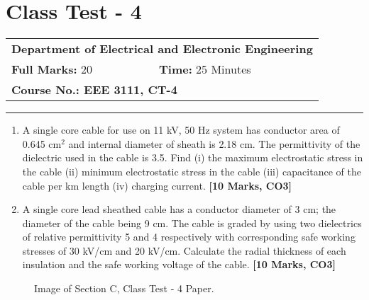 \documentclass[12pt, a4paper]{article}
\begin{document}
	\section{Class Test - 4}
	\begin{tabular}{ll}
		\multicolumn{2}{l}{\textbf{Department of Electrical and Electronic Engineering}} \\
		\textbf{Full Marks:} 20 & \textbf{Time:} 25 Minutes \\
		\multicolumn{2}{l}{\textbf{Course No.: EEE 3111, CT-4}} \\
	\end{tabular}
	\hrule
	\vspace{0.5cm}
	\begin{enumerate}[label=\textbf{Q.\arabic*}]
		\item A single core cable for use on 11 kV, 50 Hz system has conductor area of 0.645 cm$^2$ and internal diameter of sheath is 2.18 cm. The permittivity of the dielectric used in the cable is 3.5. Find (i) the maximum electrostatic stress in the cable (ii) minimum electrostatic stress in the cable (iii) capacitance of the cable per km length (iv) charging current. \hfill \textbf{[10 Marks, CO3]}
		
		\item A single core lead sheathed cable has a conductor diameter of 3 cm; the diameter of the cable being 9 cm. The cable is graded by using two dielectrics of relative permittivity 5 and 4 respectively with corresponding safe working stresses of 30 kV/cm and 20 kV/cm. Calculate the radial thickness of each insulation and the safe working voltage of the cable. \hfill \textbf{[10 Marks, CO3]}
	\end{enumerate}
	\begin{figure}[h!]
		\centering
		\caption{Image of Section C, Class Test - 4 Paper.}
	\end{figure}
	
\end{document}
